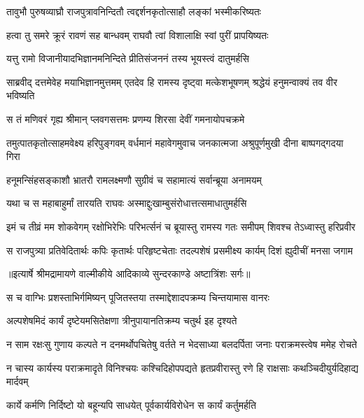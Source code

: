 \twolineshloka
{तावुभौ पुरुषव्याघ्रौ राजपुत्रावनिन्दितौ}
{त्वद्दर्शनकृतोत्साहौ लङ्कां भस्मीकरिष्यतः} %

\twolineshloka
{हत्वा तु समरे क्रूरं रावणं सह बान्धवम्}
{राघवौ त्वां विशालाक्षि स्वां पुरीं प्रापयिष्यतः} %

\twolineshloka
{यत्तु रामो विजानीयादभिज्ञानमनिन्दिते}
{प्रीतिसंजननं तस्य भूयस्त्वं दातुमर्हसि} %

\threelineshloka
{साब्रवीद् दत्तमेवेह मयाभिज्ञानमुत्तमम्}
{एतदेव हि रामस्य दृष्ट्वा मत्केशभूषणम्}
{श्रद्धेयं हनुमन्वाक्यं तव वीर भविष्यति} %

\twolineshloka
{स तं मणिवरं गृह्य श्रीमान् प्लवगसत्तमः}
{प्रणम्य शिरसा देवीं गमनायोपचक्रमे} %

\threelineshloka
{तमुत्पातकृतोत्साहमवेक्ष्य हरिपुङ्गवम्}
{वर्धमानं महावेगमुवाच जनकात्मजा}
{अश्रुपूर्णमुखी दीना बाष्पगद्गदया गिरा} %

\twolineshloka
{हनूमन्सिंहसङ्काशौ भ्रातरौ रामलक्ष्मणौ}
{सुग्रीवं च सहामात्यं सर्वान्ब्रूया अनामयम्} %

\twolineshloka
{यथा च स महाबाहुर्मां तारयति राघवः}
{अस्माद्दुःखाम्बुसंरोधात्तत्समाधातुमर्हसि} %

\fourlineindentedshloka
{इमं च तीव्रं मम शोकवेगम्}
{रक्षोभिरेभिः परिभर्त्सनं च}
{ब्रूयास्तु रामस्य गतः समीपम्}
{शिवश्च तेऽध्वास्तु हरिप्रवीर} %

\fourlineindentedshloka
{स राजपुत्र्या प्रतिवेदितार्थः}
{कपिः कृतार्थः परिहृष्टचेताः}
{तदल्पशेषं प्रसमीक्ष्य कार्यम्}
{दिशं ह्युदीचीं मनसा जगाम} %


{॥इत्यार्षे श्रीमद्रामायणे वाल्मीकीये आदिकाव्ये सुन्दरकाण्डे अष्टात्रिंशः सर्गः॥}


\twolineshloka
{स च वाग्भिः प्रशस्ताभिर्गमिष्यन् पूजितस्तया}
{तस्माद्देशादपक्रम्य चिन्तयामास वानरः} %

\twolineshloka
{अल्पशेषमिदं कार्यं दृष्टेयमसितेक्षणा}
{त्रीनुपायानतिक्रम्य चतुर्थ इह दृश्यते} %

\fourlineindentedshloka
{न साम रक्षःसु गुणाय कल्पते}
{न दनमर्थोपचितेषु वर्तते}
{न भेदसाध्या बलदर्पिता जनाः}
{पराक्रमस्त्वेष ममेह रोचते} %

\fourlineindentedshloka
{न चास्य कार्यस्य पराक्रमादृते}
{विनिश्चयः कश्चिदिहोपपद्यते}
{हृतप्रवीरास्तु रणे हि राक्षसाः}
{कथञ्चिदीयुर्यदिहाद्य मार्दवम्} %

\twolineshloka
{कार्ये कर्मणि निर्दिष्टो यो बहून्यपि साधयेत्}
{पूर्वकार्यविरोधेन स कार्यं कर्तुमर्हति} %

